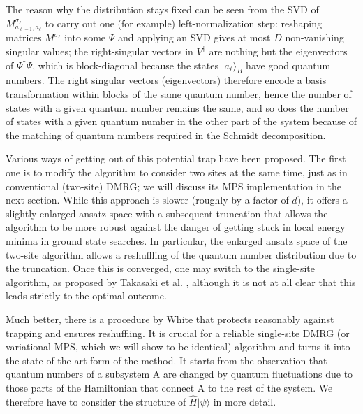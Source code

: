 \documentclass[a4paper,10pt,oneside,onecolumn,1p,times]{elsarticle}
\newcommand{\ket}[1]{\mbox{$| #1  \rangle$}}
\begin{document}
The reason why the distribution stays fixed can be seen from the SVD of $M^{\sigma_{\ell}}_{a_{\ell-1},a_{\ell}}$ to carry out one (for example) left-normalization step: reshaping matrices $M^{\sigma_{\ell}}$ into some $\Psi$ and applying an SVD gives at most $D$ non-vanishing singular values; the right-singular vectors in $V^\dagger$ are nothing but the eigenvectors of  $\Psi^\dagger \Psi$, which is block-diagonal because the states $\ket{a_{\ell}}_B$ have good quantum numbers. The right singular vectors (eigenvectors) therefore encode a basis transformation within blocks of the same quantum number, hence the number of states with a given quantum number remains the same, and so does the number of states with a given quantum number in the other part of the system because of the matching of quantum numbers required in the Schmidt decomposition. 

Various ways of getting out of this potential trap have been proposed. The first one is to modify the algorithm to consider two sites at the same time, just as in conventional (two-site) DMRG; we will discuss its MPS implementation in the next section. While this approach is slower (roughly by a factor of $d$), it offers a slightly enlarged ansatz space with a subsequent truncation that allows the algorithm to be more robust against the danger of getting stuck in local energy minima in ground state searches.  In particular, the enlarged ansatz space of the two-site algorithm allows a reshuffling of the quantum number distribution due to the truncation. Once this is converged, one may switch to the single-site algorithm, as proposed by Takasaki et al. \cite{Takasaki99}, although it is not at all clear that this leads strictly to the optimal outcome\cite{McCulloch08}.

Much better, there is a procedure by White \cite{White05} that protects reasonably against trapping and ensures reshuffling. It is crucial for a reliable single-site DMRG (or variational MPS, which we will show to be identical) algorithm and turns it into the state of the art form of the method. It starts from the observation that quantum numbers of a subsystem A are changed by quantum fluctuations due to those parts of the Hamiltonian that connect A to the rest of the system.  We therefore have to consider the structure of $\hat{H}\ket{\psi}$ in more detail. 
\end{document}
